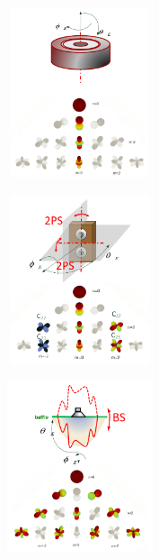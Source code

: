 \documentclass{report}
\begin{document}
\begin{minipage}{0.248\textwidth}	%
	\begin{center}
		\includegraphics[width=0.9\textwidth, height=5cm]{Appendix/Rot_Sym}
   	 	\captionsetup{hypcap=false}
    	\label{fig:rotsym}
	\end{center}
\end{minipage}
\begin{minipage}{0.248\textwidth}	%
	\begin{center}
		\includegraphics[width=0.9\textwidth, height=5cm]{Appendix/Dual_Plane_Sym}
    	\captionsetup{hypcap=false}
    	\label{fig:dualpsym}
	\end{center}
\end{minipage}
\begin{minipage}{0.248\textwidth}	%
	\begin{center}
		\includegraphics[width=0.9\textwidth, height=5cm]{Appendix/Baffle_Sym}
    	\captionsetup{hypcap=false}
    	\label{fig:bafflesym}
	\end{center}
\end{minipage}
\end{document}
